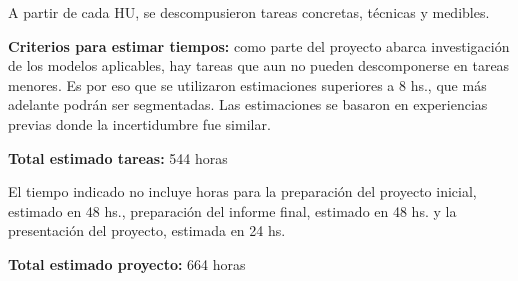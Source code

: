 \documentclass[
11pt, %
]{charter}
\begin{document}
A partir de cada HU, se descompusieron tareas concretas, técnicas y medibles.

\textbf{Criterios para estimar tiempos:} como parte del proyecto abarca investigación de los modelos aplicables, hay tareas que aun no pueden descomponerse en tareas menores. Es por eso que se utilizaron estimaciones superiores a 8 hs., que más adelante podrán ser segmentadas. Las estimaciones se basaron en experiencias previas donde la incertidumbre fue similar.

\textbf{Total estimado tareas:} 544 horas

El tiempo indicado no incluye horas para la preparación del proyecto inicial, estimado en 48 hs., preparación del informe final, estimado en 48 hs. y la presentación del proyecto, estimada en 24 hs.

\textbf{Total estimado proyecto:} 664 horas
\end{document}
